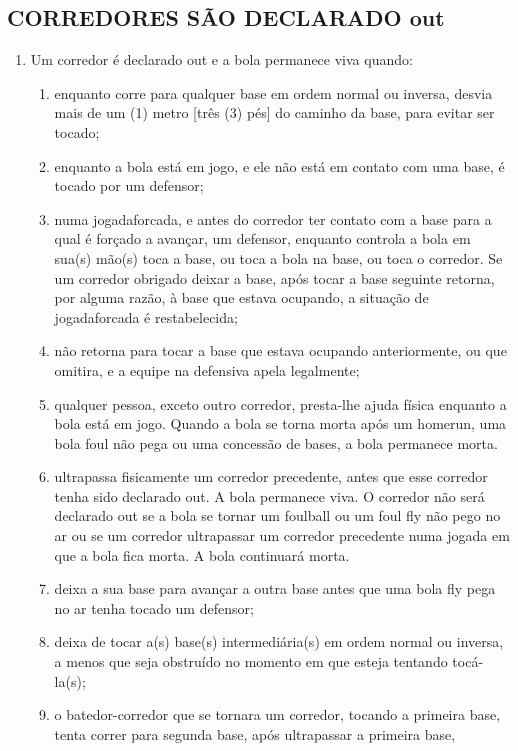 \subsection{CORREDORES SÃO DECLARADO \gls{out}}

\begin{enumerate}[label=(\alph*)]
	\item   Um corredor é declarado \gls{out} e a bola permanece viva quando:

\begin{enumerate}[label=\roman*.]
	\item enquanto corre para qualquer base em ordem normal ou inversa, desvia mais de um (1) metro [três (3) pés] do caminho da base, para evitar ser tocado;
\item  enquanto a bola está em jogo, e ele não está em contato com uma base, é tocado por um defensor;
\item  numa \gls{jogadaforcada}, e antes do corredor ter contato com a base para a qual é forçado a avançar, um defensor, enquanto controla a bola em sua(s) mão(s) toca a base, ou toca a bola na base, ou toca o corredor. Se um corredor obrigado deixar a base, após tocar a base seguinte retorna, por alguma razão, à base que estava ocupando, a situação de \gls{jogadaforcada} é restabelecida;
\item  não retorna para tocar a base que estava ocupando anteriormente, ou que omitira, e a equipe na defensiva apela legalmente;
\item qualquer pessoa, exceto outro corredor, presta-lhe ajuda física enquanto a bola está em jogo. Quando a bola se torna morta após um
 \gls{homerun}, uma bola \gls{foul} não pega ou uma concessão de bases, a bola permanece morta.
\item  ultrapassa fisicamente um corredor precedente, antes que esse corredor tenha sido declarado \gls{out}. A bola permanece viva. O corredor  não será declarado \gls{out} se a bola se tornar um \gls{foulball} ou um \gls{foul fly} não pego no ar ou se um corredor ultrapassar um corredor precedente numa jogada em que a bola fica morta. A bola continuará morta.
\item  deixa a sua base para avançar a outra base antes que uma bola \gls{fly} pega no ar tenha tocado um defensor;
\item deixa de tocar a(s) base(s) intermediária(s) em ordem normal ou inversa, a menos que seja obstruído no momento em que esteja tentando tocá-la(s);
\item  o batedor-corredor que se tornara um corredor, tocando a primeira base, tenta correr para segunda base, após ultrapassar a primeira base,

\end{enumerate}
\end{enumerate}
